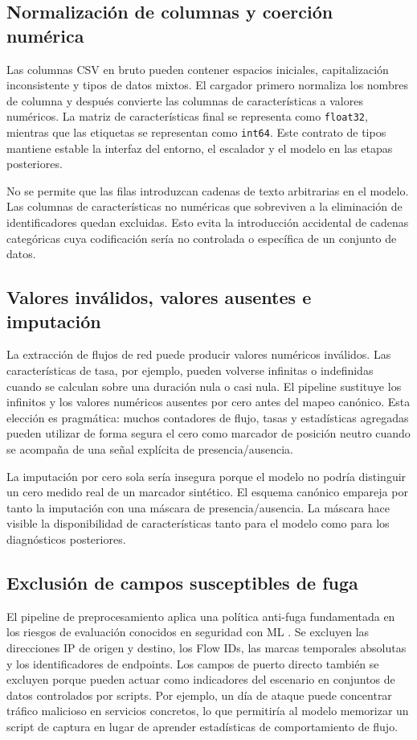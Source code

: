 \subsection{Normalización de columnas y coerción numérica}
Las columnas CSV en bruto pueden contener espacios iniciales, capitalización inconsistente y tipos de datos mixtos. El cargador primero normaliza los nombres de columna y después convierte las columnas de características a valores numéricos. La matriz de características final se representa como \texttt{float32}, mientras que las etiquetas se representan como \texttt{int64}. Este contrato de tipos mantiene estable la interfaz del entorno, el escalador y el modelo en las etapas posteriores.

No se permite que las filas introduzcan cadenas de texto arbitrarias en el modelo. Las columnas de características no numéricas que sobreviven a la eliminación de identificadores quedan excluidas. Esto evita la introducción accidental de cadenas categóricas cuya codificación sería no controlada o específica de un conjunto de datos.

\subsection{Valores inválidos, valores ausentes e imputación}
La extracción de flujos de red puede producir valores numéricos inválidos. Las características de tasa, por ejemplo, pueden volverse infinitas o indefinidas cuando se calculan sobre una duración nula o casi nula. El pipeline sustituye los infinitos y los valores numéricos ausentes por cero antes del mapeo canónico. Esta elección es pragmática: muchos contadores de flujo, tasas y estadísticas agregadas pueden utilizar de forma segura el cero como marcador de posición neutro cuando se acompaña de una señal explícita de presencia/ausencia.

La imputación por cero sola sería insegura porque el modelo no podría distinguir un cero medido real de un marcador sintético. El esquema canónico empareja por tanto la imputación con una máscara de presencia/ausencia. La máscara hace visible la disponibilidad de características tanto para el modelo como para los diagnósticos posteriores.

\subsection{Exclusión de campos susceptibles de fuga}
El pipeline de preprocesamiento aplica una política anti-fuga fundamentada en los riesgos de evaluación conocidos en seguridad con ML \parencite{Arp2020DosDontsMLSecurity,Kaufman2011LeakageDataMining}. Se excluyen las direcciones IP de origen y destino, los Flow IDs, las marcas temporales absolutas y los identificadores de endpoints. Los campos de puerto directo también se excluyen porque pueden actuar como indicadores del escenario en conjuntos de datos controlados por scripts. Por ejemplo, un día de ataque puede concentrar tráfico malicioso en servicios concretos, lo que permitiría al modelo memorizar un script de captura en lugar de aprender estadísticas de comportamiento de flujo.

